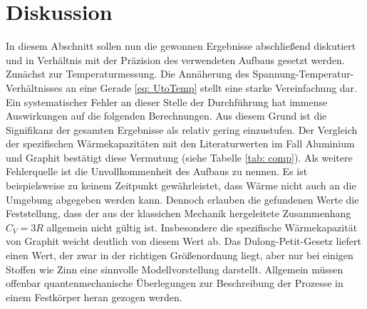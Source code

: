 \section{Diskussion}
In diesem Abschnitt sollen nun die gewonnen Ergebnisse abschließend diskutiert und in
Verhältnis mit der Präzision des verwendeten Aufbaus gesetzt werden. \\
Zunächst zur Temperaturmessung. Die Annäherung des Spannung-Temperatur-Verhältnisses
an eine Gerade \eqref{eq: UtoTemp} stellt eine starke Vereinfachung dar. Ein systematischer
Fehler an dieser Stelle der Durchführung hat immense Auswirkungen auf die folgenden Berechnungen.
Aus diesem Grund ist die Signifikanz der gesamten Ergebnisse als relativ gering einzustufen.
Der Vergleich der spezifischen Wärmekapazitäten mit den Literaturwerten im Fall Aluminium und Graphit bestätigt diese Vermutung (siehe
Tabelle \ref{tab: comp}). Als weitere Fehlerquelle ist die Unvollkommenheit des Aufbaus zu nennen.
Es ist beispielsweise zu keinem Zeitpunkt gewährleistet, dass Wärme nicht auch an die Umgebung abgegeben werden kann.
Dennoch erlauben die gefundenen Werte die Feststellung, dass der aus der klassichen Mechanik hergeleitete Zusammenhang $C_V = 3R$ allgemein
nicht gültig ist. Insbesondere die spezifische Wärmekapazität von Graphit weicht deutlich von diesem Wert ab. Das Dulong-Petit-Gesetz liefert %
einen Wert, der zwar in der richtigen Größenordnung liegt, aber nur bei einigen Stoffen wie Zinn eine sinnvolle Modellvorstellung darstellt. Allgemein
müssen offenbar quantenmechanische Überlegungen zur Beschreibung der Prozesse in einem Festkörper heran gezogen werden.

